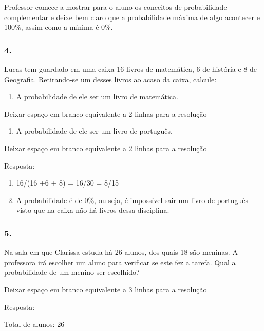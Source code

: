 Professor comece a mostrar para o aluno os conceitos de probabilidade
complementar e deixe bem claro que a probabilidade máxima de algo
acontecer e 100\%, assim como a mínima é 0\%.

\subsubsection{4.}\label{section-81}

Lucas tem guardado em uma caixa 16 livros de matemática, 6 de história e
8 de Geografia. Retirando-se um desses livros ao acaso da caixa,
calcule:

\begin{enumerate}
\def\labelenumi{\alph{enumi})}
\item
  A probabilidade de ele ser um livro de matemática.
\end{enumerate}

Deixar espaço em branco equivalente a 2 linhas para a resolução

\begin{enumerate}
\def\labelenumi{\alph{enumi})}
\item
  A probabilidade de ele ser um livro de português.
\end{enumerate}

Deixar espaço em branco equivalente a 2 linhas para a resolução

Resposta:

\begin{enumerate}
\def\labelenumi{\alph{enumi})}
\item
  16/(16 +6 + 8) = 16/30 = 8/15
\item
  A probabilidade é de 0\%, ou seja, é impossível sair um livro de
  português visto que na caixa não há livros dessa disciplina.
\end{enumerate}

\subsubsection{5.}\label{section-82}

Na sala em que Clarissa estuda há 26 alunos, dos quais 18 são meninas. A
professora irá escolher um aluno para verificar se este fez a tarefa.
Qual a probabilidade de um menino ser escolhido?

Deixar espaço em branco equivalente a 3 linhas para a resolução

Resposta:

Total de alunos: 26

